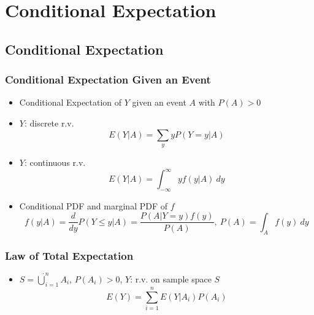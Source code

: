 \section{Conditional Expectation}

\subsection{Conditional Expectation}

\subsubsection*{Conditional Expectation Given an Event}
\begin{itemize}
    \item Conditional Expectation of $Y$ given an event $A$ with $P(A)>0$
    \item $Y$: discrete r.v.
    \begin{equation}
        E(Y|A)=\sum_yyP(Y=y|A)
    \end{equation}
    \item $Y$: continuous r.v.
    \begin{equation}
        E(Y|A)=\int_{-\infty}^\infty yf(y|A)~dy
    \end{equation}
    \item Conditional PDF and marginal PDF of $f$
    \begin{equation}
        f(y|A)=\frac{d}{dy}P(Y\leq y|A)=\frac{P(A|Y=y)f(y)}{P(A)},~P(A)=\int_Af(y)~dy
    \end{equation}
\end{itemize}

\subsubsection*{Law of Total Expectation}
\begin{itemize}
    \item $S=\dot{\bigcup}_{i=1}^nA_i$, $P(A_i)>0$, $Y$: r.v. on sample space $S$
    \begin{equation}
        E(Y)=\sum_{i=1}^nE(Y|A_i)P(A_i)
    \end{equation}
\end{itemize}

